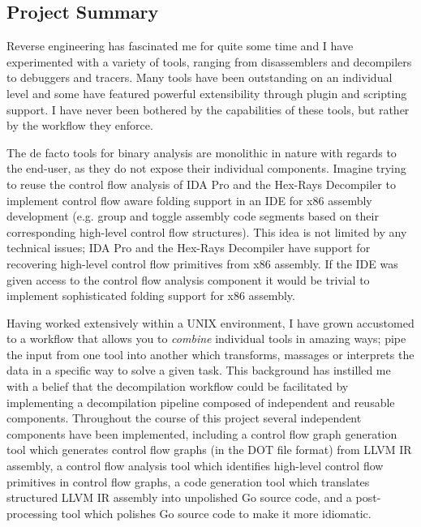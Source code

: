 
\subsection{Project Summary}

Reverse engineering has fascinated me for quite some time and I have experimented with a variety of tools, ranging from disassemblers and decompilers to debuggers and tracers. Many tools have been outstanding on an individual level and some have featured powerful extensibility through plugin and scripting support. I have never been bothered by the capabilities of these tools, but rather by the workflow they enforce.

The de facto tools for binary analysis are monolithic in nature with regards to the end-user, as they do not expose their individual components. Imagine trying to reuse the control flow analysis of IDA Pro and the Hex-Rays Decompiler to implement control flow aware folding support in an IDE for x86 assembly development (e.g. group and toggle assembly code segments based on their corresponding high-level control flow structures). This idea is not limited by any technical issues; IDA Pro and the Hex-Rays Decompiler have support for recovering high-level control flow primitives from x86 assembly. If the IDE was given access to the control flow analysis component it would be trivial to implement sophisticated folding support for x86 assembly.

Having worked extensively within a UNIX environment, I have grown accustomed to a workflow that allows you to \textit{combine} individual tools in amazing ways; pipe the input from one tool into another which transforms, massages or interprets the data in a specific way to solve a given task. This background has instilled me with a belief that the decompilation workflow could be facilitated by implementing a decompilation pipeline composed of independent and reusable components. Throughout the course of this project several independent components have been implemented, including a control flow graph generation tool which generates control flow graphs (in the DOT file format) from LLVM IR assembly, a control flow analysis tool which identifies high-level control flow primitives in control flow graphs, a code generation tool which translates structured LLVM IR assembly into unpolished Go source code, and a post-processing tool which polishes Go source code to make it more idiomatic.


